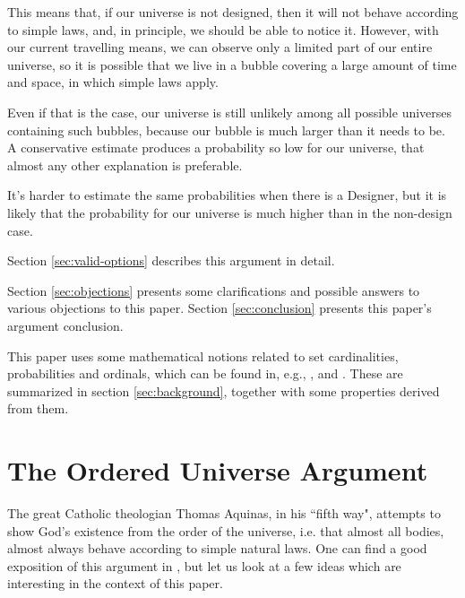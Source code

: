 \documentclass[a4paper
,draft
]{article}
\newcommand{\paper}[1]{paper}
\newcommand{\ghilimele}[1]{``#1"}
\begin{document}
This means that, if our universe is not designed, then it will not behave
according to simple laws, and, in principle, we should be able to notice it.
However, with our current travelling means, we can observe only a limited
part of our entire universe, so it is possible that we live in a bubble covering
a large amount of time and space, in which simple laws apply.

Even if that is the case, our universe is still unlikely among all possible
universes
containing such bubbles, because our bubble is much larger than it needs to
be.
A conservative estimate produces a probability so low for our universe,
that almost any other explanation is preferable.

It's harder to estimate the same probabilities when there is a Designer, but
it is likely that the probability for our universe is much higher than in the
non-design case.

Section \ref{sec:valid-options} describes this argument in detail.

Section \ref{sec:objections} presents some clarifications and possible
answers to various objections to this paper.
Section \ref{sec:conclusion} presents this \paper{}'s argument conclusion.

This \paper{} uses some mathematical notions related to set cardinalities,
probabilities and ordinals, which can be found in, e.g.,
\textcite{sep-set-theory}, \textcite{Cohen1966} and \textcite{Billingsley1995}.
These are summarized in section \ref{sec:background}, together with some properties
derived from them.

\section{The Ordered Universe Argument}
\label{sec:ordered-universe}

The great Catholic theologian Thomas Aquinas,
in his \ghilimele{fifth way}, attempts to show God's existence from
the order of the universe, i.e. that almost all bodies, almost always
behave according to simple natural laws.
One can find a good exposition of this argument in
\parencite{swinburne1968}, but let us look at a few ideas which are
interesting in the context of this \paper{}.
\end{document}
